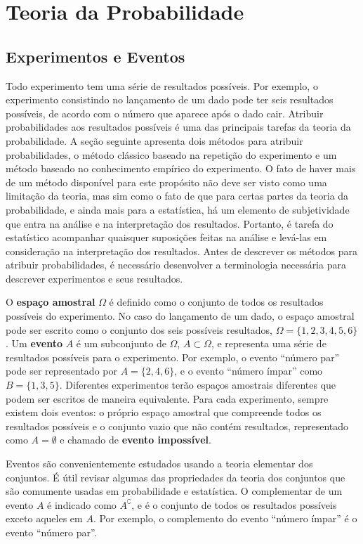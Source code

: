\chapter{Teoria da Probabilidade}\label{cap:1-1}

\section{Experimentos e Eventos}

Todo experimento tem uma série de resultados possíveis. Por exemplo, o experimento consistindo no lançamento de um dado pode ter seis resultados possíveis, de acordo com o número que aparece após o dado cair. Atribuir probabilidades aos resultados possíveis é uma das principais tarefas da teoria da probabilidade. A seção seguinte apresenta dois métodos para atribuir probabilidades, o método clássico baseado na repetição do experimento e um método baseado no conhecimento empírico do experimento. O fato de haver mais de um método disponível para este propósito não deve ser visto como uma limitação da teoria, mas sim como o fato de que para certas partes da teoria da probabilidade, e ainda mais para a estatística, há um elemento de subjetividade que entra na análise e na interpretação dos resultados. Portanto, é tarefa do estatístico acompanhar quaisquer suposições feitas na análise e levá-las em consideração na interpretação dos resultados. Antes de descrever os métodos para atribuir probabilidades, é necessário desenvolver a terminologia necessária para descrever experimentos e seus resultados.

O \textbf{espaço amostral} $\Omega$ é definido como o conjunto de todos os resultados possíveis do experimento. No caso do lançamento de um dado, o espaço amostral pode ser escrito como o conjunto dos seis possíveis resultados, $\Omega = \{1, 2, 3, 4, 5, 6\}$. Um \textbf{evento} $A$ é um subconjunto de $\Omega$, $A \subset \Omega$, e representa uma série de resultados possíveis para o experimento. Por exemplo, o evento ``número par'' pode ser representado por $A = \{2, 4, 6\}$, e o evento ``número ímpar'' como $B = \{1, 3, 5\}$. Diferentes experimentos terão espaços amostrais diferentes que podem ser escritos de maneira equivalente. Para cada experimento, sempre existem dois eventos: o próprio espaço amostral que compreende todos os resultados possíveis e o conjunto vazio que não contém resultados, representado como $A = \emptyset$ e chamado de \textbf{evento impossível}. 

Eventos são convenientemente estudados usando a teoria elementar dos conjuntos. É útil revisar algumas das propriedades da teoria dos conjuntos que são comumente usadas em probabilidade e estatística. O complementar de um evento $A$ é indicado como $A^\complement$, e é o conjunto de todos os resultados possíveis exceto aqueles em $A$. Por exemplo, o complemento do evento ``número ímpar'' é o evento ``número par''. 

